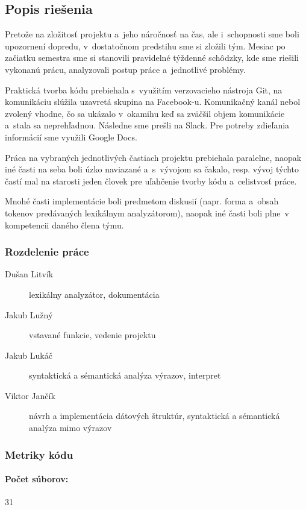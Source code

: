 \documentclass[12pt,a4paper,titlepage,final]{article}
\begin{document}
\subsection{Popis riešenia}

Pretože na zložitosť projektu a jeho náročnosť na čas, ale i schopnosti sme boli upozornení dopredu, v dostatočnom predstihu sme si zložili tým. Mesiac po začiatku semestra sme si stanovili pravidelné týždenné schôdzky, kde sme riešili vykonanú prácu, analyzovali postup práce a jednotlivé problémy. 

Praktická tvorba kódu prebiehala s využitím verzovacieho nástroja Git, na komunikáciu slúžila uzavretá skupina na Facebook-u. Komunikačný kanál nebol zvolený vhodne, čo sa ukázalo v okamihu keď sa zväčšil objem komunikácie a stala sa neprehľadnou. Následne sme prešli na Slack. Pre potreby zdieľania informácií sme využili Google Docs.

Práca na vybraných jednotlivých častiach projektu prebiehala paralelne, naopak iné časti na seba boli úzko naviazané a s vývojom sa čakalo, resp. vývoj týchto častí mal na starosti jeden človek pre uľahčenie tvorby kódu a celistvosť práce. 

Mnohé časti implementácie boli predmetom diskusií (napr. forma a obsah tokenov predávaných lexikálnym analyzátorom), naopak iné časti boli plne v kompetencii daného člena týmu. 

\subsubsection{Rozdelenie práce}
\begin{description}
  \item[Dušan Litvík] lexikálny analyzátor, dokumentácia
  \item[Jakub Lužný] vstavané funkcie, vedenie projektu
  \item[Jakub Lukáč] syntaktická a sémantická analýza výrazov, interpret
  \item[Viktor Jančík] návrh a implementácia dátových štruktúr, syntaktická a sémantická analýza mimo výrazov
\end{description}

\subsubsection{Metriky kódu}
\paragraph{Počet súborov:} 31
\end{document}
